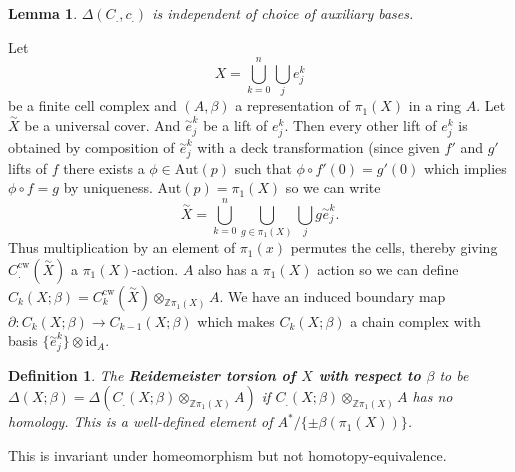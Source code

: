 \documentclass{article}
\newtheorem{definition}[theorem]{Definition}
\newtheorem{lemma}[theorem]{Lemma}
\begin{document}
\begin{lemma}
$\Delta(C_.,c_.)$ is independent of choice of auxiliary bases.
\end{lemma}


\noindent Let \[X=\bigcup_{k=0}^n\bigcup_je_j^k\] be a finite cell complex and $(A,\beta)$ a representation of $\pi_1(X)$ in a ring $A$. Let $\overset{\sim}{X}$ be a universal cover. And $\overset{\sim}{e}_j^k$ be a lift of $e_j^k$. Then every other lift of $e_j^k$ is obtained by composition of $\overset{\sim}{e}_j^k$ with a deck transformation (since given $f'$ and $g'$ lifts of $f$ there exists a $\phi\in\text{Aut}(p)$ such that $\phi\circ f'(0)=g'(0)$ which implies $\phi\circ f=g$ by uniqueness. $\text{Aut}(p)=\pi_1(X)$ so we can write \[\overset{\sim}{X}=\bigcup_{k=0}^n\bigcup_{g\in\pi_1(X)}\bigcup_jg\overset{\sim}{e}_j^k.\] Thus multiplication by an element of $\pi_1(x)$ permutes the cells, thereby giving $C_.^\text{cw}(\overset{\sim}{X})$ a $\pi_1(X)$-action. $A$ also has a $\pi_1(X)$ action so we can define $C_k(X;\beta)=C_k^\text{cw}(\overset{\sim}{X})\otimes_{\mathbb{Z}\pi_1(X)} A$. We have an induced boundary map $\partial\colon C_k(X;\beta)\to C_{k-1}(X;\beta)$ which makes $C_k(X;\beta)$ a chain complex with basis $\{\overset{\sim}{e}_j^k\}\otimes\text{id}_A$.

\begin{definition}
The \textbf{Reidemeister torsion of $X$ with respect to $\beta$} to be $\Delta(X;\beta)=\Delta(C_.(X;\beta)\otimes_{\mathbb{Z}\pi_1(X)}A)$ if $C_.(X;\beta)\otimes_{\mathbb{Z}\pi_1(X)}A$ has no homology. This is a well-defined element of $A^*/\{\pm\beta(\pi_1(X))\}$.
\end{definition}

\noindent This is invariant under homeomorphism but not homotopy-equivalence.
\end{document}
